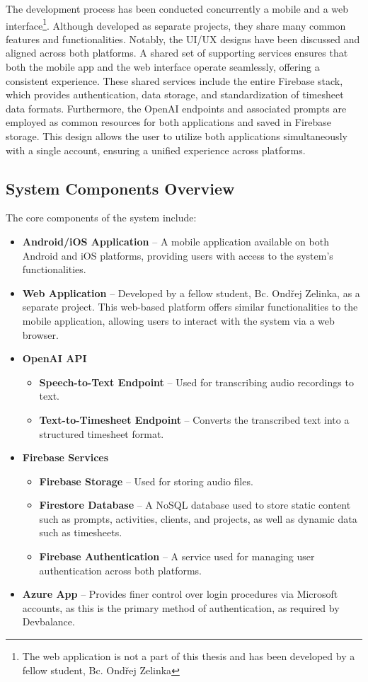 \documentclass[
  digital,     %
  oneside,     %
  nosansbold,  %
  nocolorbold, %
  lof,         %
  lot,         %
]{fithesis4}
\begin{document}
The development process has been conducted concurrently a mobile and a web interface\footnote{The web application is not a part of this thesis and has been developed by a fellow student, Bc. Ondřej Zelinka}. Although developed as separate projects, they share many common features and functionalities. Notably, the UI/UX designs have been discussed and aligned across both platforms. A shared set of supporting services ensures that both the mobile app and the web interface operate seamlessly, offering a consistent experience. These shared services include the entire Firebase stack, which provides authentication, data storage, and standardization of timesheet data formats. Furthermore, the OpenAI endpoints and associated prompts are employed as common resources for both applications and saved in Firebase storage. This design allows the user to utilize both applications simultaneously with a single account, ensuring a unified experience across platforms.

\subsection{System Components Overview}

The core components of the system include:

\begin{itemize}
    \item \textbf{Android/iOS Application} – A mobile application available on both Android and iOS platforms, providing users with access to the system's functionalities.
    \item \textbf{Web Application} – Developed by a fellow student, Bc. Ondřej Zelinka, as a separate project. This web-based platform offers similar functionalities to the mobile application, allowing users to interact with the system via a web browser.
    \item \textbf{OpenAI API}
    \begin{itemize}
        \item \textbf{Speech-to-Text Endpoint} – Used for transcribing audio recordings to text.
        \item \textbf{Text-to-Timesheet Endpoint} – Converts the transcribed text into a structured timesheet format.
    \end{itemize}
    \item \textbf{Firebase Services}
    \begin{itemize}
        \item \textbf{Firebase Storage} – Used for storing audio files.
        \item \textbf{Firestore Database} – A NoSQL database used to store static content such as prompts, activities, clients, and projects, as well as dynamic data such as timesheets.
        \item \textbf{Firebase Authentication} – A service used for managing user authentication across both platforms.
    \end{itemize}
    \item \textbf{Azure App} – Provides finer control over login procedures via Microsoft accounts, as this is the primary method of authentication, as required by Devbalance.
\end{itemize}
\end{document}
